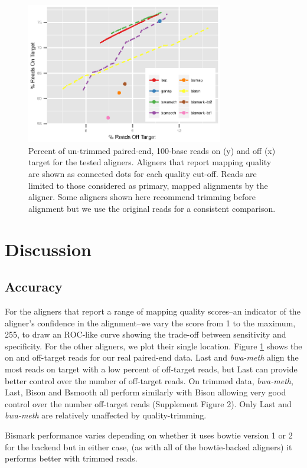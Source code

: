 \documentclass{bioinfo}
\begin{document}
\begin{figure}[!tpb]%
    \centerline{\includegraphics[width=86mm]{real-quals}}
    \caption{Percent of un-trimmed paired-end, 100-base reads on (y) and off (x)
    target for the tested aligners. Aligners that report mapping quality are
shown as connected dots for each quality cut-off. Reads are limited to those
considered as primary, mapped alignments by the aligner. Some aligners
shown here recommend trimming before alignment but we use the original reads
for a consistent comparison. }\label{fig:01}
\end{figure}

\section{Discussion}

\subsection{Accuracy}
For the aligners that report a range of mapping quality
scores--an indicator of the aligner's confidence in the
alignment--we vary the score from 1 to the maximum, 255, to draw an ROC-like
curve showing the trade-off between sensitivity and specificity. For the
other aligners, we plot their single location. Figure \ref{fig:01} shows
the on and off-target reads for our real paired-end data. Last and 
\textit{bwa-meth} align the most reads on target with a low percent
of off-target reads, but Last can provide better control over the number
of off-target reads. On trimmed data, \textit{bwa-meth}, Last, Bison and
Bsmooth all perform similarly with Bison allowing very good control
over the number off-target reads (Supplement Figure 2).
Only Last and \textit{bwa-meth} are relatively unaffected by quality-trimming.

Bismark performance varies depending on whether it uses bowtie version
1 or 2 for the backend but in either case, (as with all of the bowtie-backed
aligners) it performs better with trimmed reads.
\end{document}

